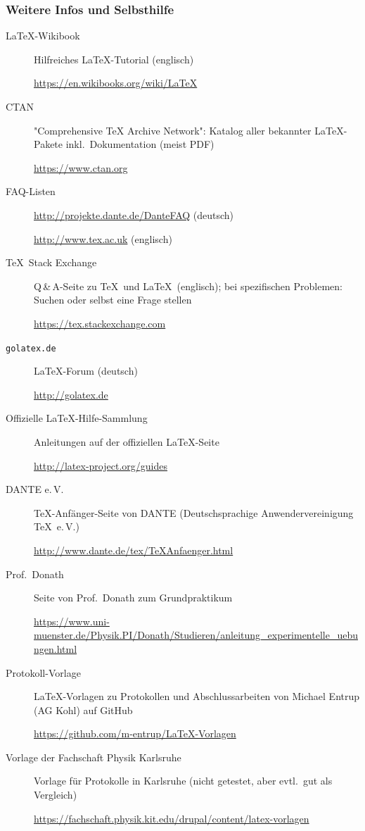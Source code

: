 \begin{frame}[<+->]
	\frametitle{Weitere Infos und Selbsthilfe}
	
	\begin{description}
		\item[\LaTeX-Wikibook] Hilfreiches \LaTeX-Tutorial (englisch)
		
		\url{https://en.wikibooks.org/wiki/LaTeX}
		\item[CTAN] "Comprehensive TeX Archive Network": Katalog aller bekannter \LaTeX-Pakete inkl.\ Dokumentation (meist PDF)
		
		\url{https://www.ctan.org}
		\item[FAQ-Listen] \url{http://projekte.dante.de/DanteFAQ} (deutsch)
		
		\url{http://www.tex.ac.uk} (englisch)
		\item[\TeX\ Stack Exchange] Q\,\&\,A-Seite zu \TeX\ und \LaTeX\ (englisch); bei spezifischen Problemen: Suchen oder selbst eine Frage stellen
		
		\url{https://tex.stackexchange.com}
		\item[\texttt{golatex.de}] \LaTeX-Forum (deutsch)
		
		\url{http://golatex.de}
		\item[Offizielle \LaTeX-Hilfe-Sammlung] Anleitungen auf der offiziellen \LaTeX-Seite
		
		\url{http://latex-project.org/guides}
	\end{description}
\end{frame}

\begin{frame}[<+->]
	\begin{description}
		\item[DANTE e.\,V.] \TeX-Anfänger-Seite von DANTE (Deutschsprachige Anwendervereinigung \TeX\ e.\,V.) 
		
		\url{http://www.dante.de/tex/TeXAnfaenger.html}
	\end{description}
	\begin{description}
		\item[Prof.\ Donath] Seite von Prof.\ Donath zum Grundpraktikum
		
		\url{https://www.uni-muenster.de/Physik.PI/Donath/Studieren/anleitung_experimentelle_uebungen.html}
		\item[Protokoll-Vorlage] \LaTeX-Vorlagen zu Protokollen und Abschlussarbeiten von Michael Entrup (AG Kohl) auf GitHub
		
		\url{https://github.com/m-entrup/LaTeX-Vorlagen}
		\item[Vorlage der Fachschaft Physik Karlsruhe] Vorlage für Protokolle in Karlsruhe (nicht getestet, aber evtl.\ gut als Vergleich)
		
		\url{https://fachschaft.physik.kit.edu/drupal/content/latex-vorlagen}
	\end{description}
\end{frame}

